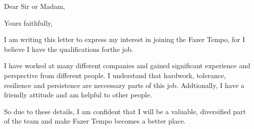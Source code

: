 \documentclass[11pt,a4paper,sans]{moderncv}
\begin{document}
  \clearpage
  \date{February 28, 2020}
  \opening{Dear Sir or Madam,}
  \closing{Yours faithfully,}
  \makelettertitle

  I am writing this letter to express my interest in joining the Fazer Tempo, for
  I believe I have the qualifications forthe job.

  I have worked at many different companies and gained significant experience and perspective
  from different people. I understand that hardwork, tolerance, resilience and persistence
  are neccessary parts of this job. Addtionally, I have a friendly attitude and am helpful
  to other people.

  So due to these details, I am confident that I will be a valuable, diversified
  part of the team and make Fazer Tempo becomes a better place.

  \makeletterclosing
\end{document}
